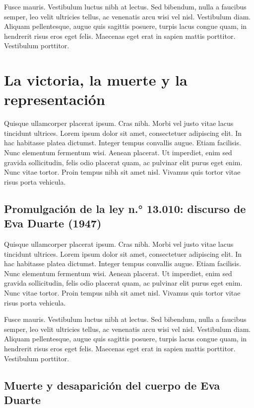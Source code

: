Fusce mauris. Vestibulum luctus nibh at lectus. Sed bibendum, nulla a faucibus semper, leo velit ultricies tellus, ac venenatis arcu wisi vel nisl. Vestibulum diam. Aliquam pellentesque, augue quis sagittis posuere, turpis lacus congue quam, in hendrerit risus eros eget felis. Maecenas eget erat in sapien mattis porttitor. Vestibulum porttitor.

\chapter{La victoria, la muerte y la representación}

Quisque ullamcorper placerat ipsum. Cras nibh. Morbi vel justo vitae lacus tincidunt ultrices. Lorem ipsum dolor sit amet, consectetuer adipiscing elit. In hac habitasse platea dictumst. Integer tempus convallis augue. Etiam facilisis. Nunc elementum fermentum wisi. Aenean placerat. Ut imperdiet, enim sed gravida sollicitudin, felis odio placerat quam, ac pulvinar elit purus eget enim. Nunc vitae tortor. Proin tempus nibh sit amet nisl. Vivamus quis tortor vitae risus porta vehicula.

\section{Promulgación de la ley n.° 13.010: discurso de Eva Duarte (1947)}

Quisque ullamcorper placerat ipsum. Cras nibh. Morbi vel justo vitae lacus tincidunt ultrices. Lorem ipsum dolor sit amet, consectetuer adipiscing elit. In hac habitasse platea dictumst. Integer tempus convallis augue. Etiam facilisis. Nunc elementum fermentum wisi. Aenean placerat. Ut imperdiet, enim sed gravida sollicitudin, felis odio placerat quam, ac pulvinar elit purus eget enim. Nunc vitae tortor. Proin tempus nibh sit amet nisl. Vivamus quis tortor vitae risus porta vehicula.

Fusce mauris. Vestibulum luctus nibh at lectus. Sed bibendum, nulla a faucibus semper, leo velit ultricies tellus, ac venenatis arcu wisi vel nisl. Vestibulum diam. Aliquam pellentesque, augue quis sagittis posuere, turpis lacus congue quam, in hendrerit risus eros eget felis. Maecenas eget erat in sapien mattis porttitor. Vestibulum porttitor.

\section{Muerte y desaparición del cuerpo de Eva Duarte}

